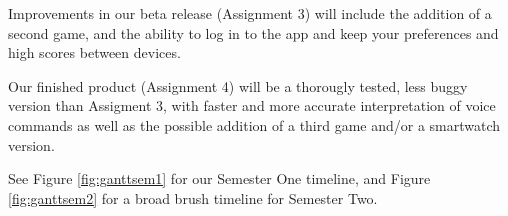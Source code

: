 \documentclass[11pt, oneside]{article}
\newcounter{myWeekNum}
\newcommand{\myWeek}{\themyWeekNum
    \stepcounter{myWeekNum}
    \ifnum\themyWeekNum=53
         \setcounter{myWeekNum}{1}
    \else\fi
}
\begin{document}
Improvements in our beta release (Assignment 3) will include the
addition of a second game, and the ability to log in to the app and
keep your preferences and high scores between devices.

Our finished product (Assignment 4) will be a thorougly tested, less
buggy version than Assigment 3, with faster and more accurate
interpretation of voice commands as well as the possible addition of a
third game and/or a smartwatch version.

See Figure \ref{fig:ganttsem1} for our Semester One timeline, and
Figure \ref{fig:ganttsem2} for a broad brush timeline for Semester Two.

\end{document}
